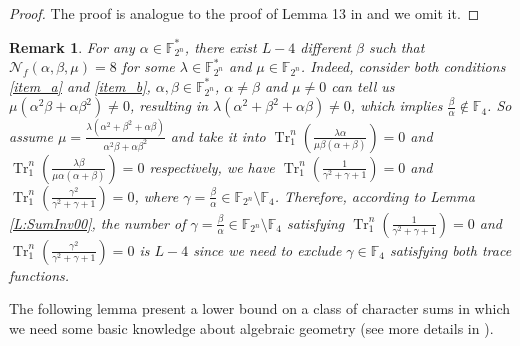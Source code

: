 \documentclass{article}
\newcommand{\F}{\mathbb{F}}
\newcommand{\0}{\textbf{0}}
\newcommand{\1}{\textbf{1}}
\newcommand{\TrN}{\operatorname{Tr}_1^n}
\theoremstyle{plain}
\newtheorem{remark}{Remark}
\begin{document}
    \begin{proof}
        The proof is analogue to the proof of Lemma 13 in \cite{tang2022invfunc} and we omit it.
    \end{proof}
    \begin{remark}
        For any $\alpha\in\F_{2^n}^*$, there exist $L-4$ different $\beta$
        such that $\mathcal{N}_f(\alpha,\beta,\mu)=8$ for some $\lambda\in\F_{2^n}^*$ and $\mu\in\F_{2^n}$.
        Indeed, consider both conditions \ref{item_a} and \ref{item_b}, $\alpha,\beta\in\F_{2^n}^*$, $\alpha\ne\beta$ and $\mu\ne 0$
        can tell us $\mu(\alpha^2\beta+\alpha\beta^2)\ne 0$,
        resulting in $\lambda(\alpha^2+\beta^2+\alpha\beta)\ne 0$,
        which implies $\frac{\beta}{\alpha}\notin\F_4$.
        So assume $\mu=\frac{\lambda(\alpha^2+\beta^2+\alpha\beta)}{\alpha^2\beta+\alpha\beta^2}$ and take it 
        into $\TrN\left(\frac{\lambda \alpha}{\mu \beta(\alpha+\beta)}\right)=0$
        and $\TrN\left(\frac{\lambda \beta}{\mu \alpha(\alpha+\beta)}\right)=0$ respectively,
        we have $\TrN\left(\frac{1}{\gamma^2+\gamma+1}\right)=0$ and $\TrN\left(\frac{\gamma^2}{\gamma^2+\gamma+1}\right)=0$,
        where $\gamma=\frac{\beta}{\alpha}\in\F_{2^n}\setminus\F_{4}$.
        Therefore, according to Lemma \ref{L:SumInv00},
        the number of $\gamma=\frac{\beta}{\alpha}\in\F_{2^n}\setminus\F_{4}$ satisfying
        $\TrN\left(\frac{1}{\gamma^2+\gamma+1}\right)=0$ and $\TrN\left(\frac{\gamma^2}{\gamma^2+\gamma+1}\right)=0$
        is $L-4$ since we need to exclude $\gamma\in\F_4$ satisfying both trace functions.
    \end{remark}


The following lemma present a lower bound on a class of character sums in which we need some basic knowledge
about  algebraic geometry (see more details in \cite{Stichtenoth2008book_algebraicfunctionfieldsandcodes}).
\end{document}
